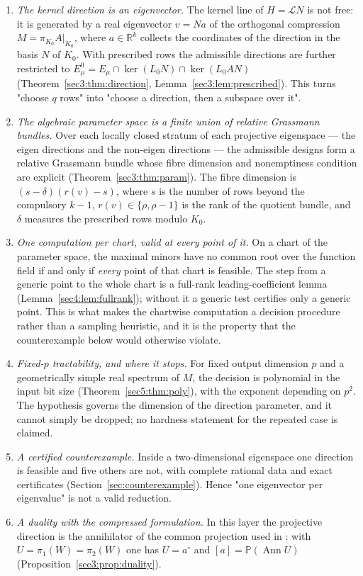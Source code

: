 \documentclass[journal]{IEEEtran}
\theoremstyle{plainn}
\theoremstyle{remark}
\newcommand{\Ann}{\operatorname{Ann}}
\begin{document}
\begin{enumerate}[label=(\Alph*),leftmargin=*]
\item \emph{The kernel direction is an eigenvector.} The kernel line of $H=\mathcal LN$ is not free: it
is generated by a real eigenvector $v=Na$ of the orthogonal compression $M=\pi_{K_0}A|_{K_0}$, where
$a\in\mathbb R^k$ collects the coordinates of the direction in the basis $N$ of $K_0$. With prescribed
rows the admissible directions are further restricted to
$E_\mu^0=E_\mu\cap\ker(L_0N)\cap\ker(L_0AN)$ (Theorem~\ref{sec3:thm:direction},
Lemma~\ref{sec3:lem:prescribed}). This turns "choose $q$ rows" into "choose a direction, then a
subspace over it".
\item \emph{The algebraic parameter space is a finite union of relative Grassmann bundles.} Over each
locally closed stratum of each projective eigenspace --- the eigen directions and the non-eigen
directions --- the admissible designs form a relative Grassmann bundle whose fibre dimension and
nonemptiness condition are explicit (Theorem~\ref{sec3:thm:param}). The fibre dimension is
$(s-\delta)(r(v)-s)$, where $s$ is the number of rows beyond the compulsory $k-1$, $r(v)\in\{\rho,\rho-1\}$
is the rank of the quotient bundle, and $\delta$ measures the prescribed rows modulo $K_0$.
\item \emph{One computation per chart, valid at every point of it.} On a chart of the parameter space,
the maximal minors have no common root over the function field if and only if \emph{every} point of
that chart is feasible. The step from a generic point to the whole chart is a full-rank
leading-coefficient lemma (Lemma~\ref{sec4:lem:fullrank}); without it a generic test certifies only a
generic point. This is what makes the chartwise computation a decision procedure rather than a
sampling heuristic, and it is the property that the counterexample below would otherwise violate.
\item \emph{Fixed-$p$ tractability, and where it stops.} For fixed output dimension $p$ and a
geometrically simple real spectrum of $M$, the decision is polynomial in the input bit size
(Theorem~\ref{sec5:thm:poly}), with the exponent depending on $p^2$. The hypothesis governs the
dimension of the direction parameter, and it cannot simply be dropped; no hardness statement for the
repeated case is claimed.
\item \emph{A certified counterexample.} Inside a two-dimensional eigenspace one direction is feasible
and five others are not, with complete rational data and exact certificates
(Section~\ref{sec:counterexample}). Hence "one eigenvector per eigenvalue" is not a valid reduction.
\item \emph{A duality with the compressed formulation.} In this layer the projective direction is the
annihilator of the common projection used in \cite{companion2}: with $U=\pi_1(W)=\pi_2(W)$ one has
$U=a^\circ$ and $[a]=\mathbb P(\Ann U)$ (Proposition~\ref{sec3:prop:duality}).
\end{enumerate}
\end{document}
